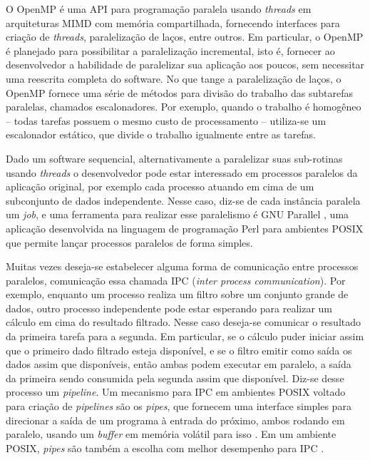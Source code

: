 \documentclass[cic,tc]{iiufrgs}
\begin{document}
O OpenMP \cite{chandra2001parallel} é uma API para programação paralela usando \textit{threads} em
arquiteturas MIMD com memória compartilhada, fornecendo interfaces para criação
de \textit{threads}, paralelização de laços, entre outros. Em particular, o
OpenMP é planejado para possibilitar a paralelização incremental, isto é,
fornecer ao desenvolvedor a habilidade de paralelizar sua aplicação aos poucos,
sem necessitar uma reescrita completa do software. No que tange a
paralelização de laços, o OpenMP fornece uma série de métodos para divisão do
trabalho das subtarefas paralelas, chamados escalonadores. Por exemplo, quando
o trabalho é homogêneo -- todas tarefas possuem o mesmo custo de processamento
-- utiliza-se um escalonador estático, que divide o trabalho igualmente entre
as tarefas.

Dado um software sequencial, alternativamente a paralelizar suas
sub-rotinas usando \textit{threads} o desenvolvedor pode estar interessado em
processos paralelos da aplicação original, por exemplo cada processo atuando
em cima de um subconjunto de dados independente. Nesse caso, diz-se de cada
instância paralela um \textit{job}, e uma ferramenta para realizar esse
paralelismo é GNU Parallel \cite{tange_ole_2021_5233953}, uma aplicação
desenvolvida na linguagem de programação Perl para ambientes POSIX que permite
lançar processos paralelos de forma simples.

Muitas vezes deseja-se estabelecer alguma forma de comunicação entre processos
paralelos, comunicação essa chamada IPC (\textit{inter process communication}).
Por exemplo, enquanto um processo realiza um filtro sobre um conjunto grande
de dados, outro processo independente pode estar esperando para realizar um
cálculo em cima do resultado filtrado. Nesse caso deseja-se comunicar o
resultado da primeira tarefa para a segunda. Em particular, se o cálculo puder
iniciar assim que o primeiro dado filtrado esteja disponível, e se o filtro
emitir como saída os dados assim que disponíveis, então ambas podem executar em
paralelo, a saída da primeira sendo consumida pela segunda assim que
disponível. Diz-se desse processo um \textit{pipeline}. Um mecanismo para IPC
em ambientes POSIX voltado para criação de \textit{pipelines} são os \textit{pipes}, que
fornecem uma interface simples para direcionar a saída de um programa à entrada
do próximo, ambos rodando em paralelo, usando um \textit{buffer} em memória
volátil para isso \cite{immich2003performance}. Em um ambiente POSIX, \textit{pipes} são
também a escolha com melhor desempenho para IPC \cite{immich2003performance}.
\end{document}
